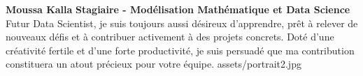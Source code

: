 \documentclass[theme]{cv_einstein}
\begin{document}
    \header
    {\textbf{Moussa Kalla}}
    {\textbf{Stagiaire - Modélisation Mathématique et Data Science }}
    { 
Futur Data Scientist, je suis toujours aussi désireux d’apprendre, prêt à relever de nouveaux défis et à contribuer activement à des projets concrets. Doté d’une créativité fertile et d’une forte productivité, je suis persuadé que ma contribution constituera un atout précieux pour
votre équipe.
    }
    {assets/portrait2.jpg}


    \vspace{\headerheight} %
\end{document}
